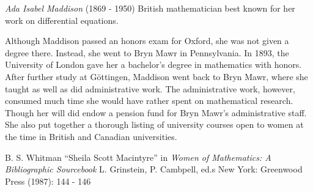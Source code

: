 \documentclass[12pt]{article}
\begin{document}

\emph{Ada Isabel Maddison} (1869 - 1950) British mathematician best known for her work on differential equations.

Although Maddison passed an honors exam for Oxford, she was not given a degree there. Instead, she went to Bryn Mawr in Pennsylvania. In 1893, the University of London gave her a bachelor's degree in mathematics with honors. After further study at G\"ottingen, Maddison went back to Bryn Mawr, where she taught as well as did administrative work. The administrative work, however, consumed  much time she would have rather spent on mathematical research. Though her will did endow a pension fund for Bryn Mawr's administrative staff. She also put together a thorough listing of university courses open to women at the time in British and Canadian universities.

\begin{thebibliography}{1}
 B. S. Whitman ``Sheila Scott Macintyre'' in {\it Women of Mathematics: A Bibliographic Sourcebook} L. Grinstein, P. Cambpell, ed.s New York: Greenwood Press (1987): 144 - 146
\end{thebibliography}
\end{document}
